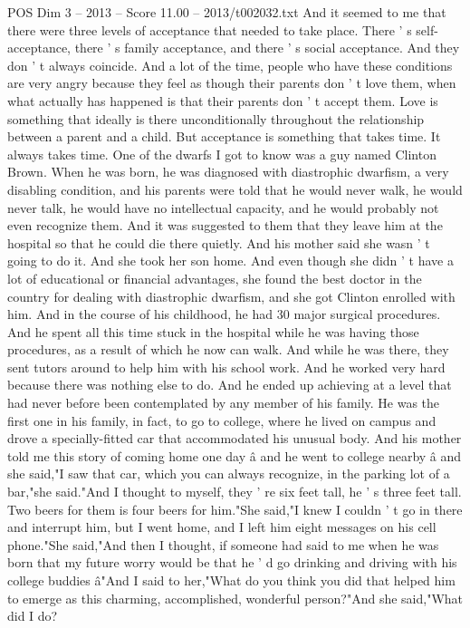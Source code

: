 \begin{textsample}{POS Dim 3 – 2013 – Score 11.00 – 2013/t002032.txt}
And it seemed to me that there were three levels of acceptance that needed to take place.
There ' s self- acceptance, there ' s family acceptance, and there ' s social acceptance.
And they don ' t always coincide.
And a lot of the time, people who have these conditions are very angry because they feel as though their parents don ' t love them, when what actually has happened is that their parents don ' t accept them.
Love is something that ideally is there unconditionally throughout the relationship between a parent and a child.
But acceptance is something that takes time.
It always takes time.
One of the dwarfs I got to know was a guy named Clinton Brown.
When he was born, he was diagnosed with diastrophic dwarfism, a very disabling condition, and his parents were told that he would never walk, he would never talk, he would have no intellectual capacity, and he would probably not even recognize them.
And it was suggested to them that they leave him at the hospital so that he could die there quietly.
And his mother said she wasn ' t going to do it.
And she took her son home.
And even though she didn ' t have a lot of educational or financial advantages, she found the best doctor in the country for dealing with diastrophic dwarfism, and she got Clinton enrolled with him.
And in the course of his childhood, he had 30 major surgical procedures.
And he spent all this time stuck in the hospital while he was having those procedures, as a result of which he now can walk.
And while he was there, they sent tutors around to help him with his school work.
And he worked very hard because there was nothing else to do.
And he ended up achieving at a level that had never before been contemplated by any member of his family.
He was the first one in his family, in fact, to go to college, where he lived on campus and drove a specially-fitted car that accommodated his unusual body.
And his mother told me this story of coming home one day â and he went to college nearby â and she said,"I saw that car, which you can always recognize, in the parking lot of a bar,"she said."And I thought to myself, they ' re six feet tall, he ' s three feet tall.
Two beers for them is four beers for him."She said,"I knew I couldn ' t go in there and interrupt him, but I went home, and I left him eight messages on his cell phone."She said,"And then I thought, if someone had said to me when he was born that my future worry would be that he ' d go drinking and driving with his college buddies â"And I said to her,"What do you think you did that helped him to emerge as this charming, accomplished, wonderful person?"And she said,"What did I do?

\end{textsample}
